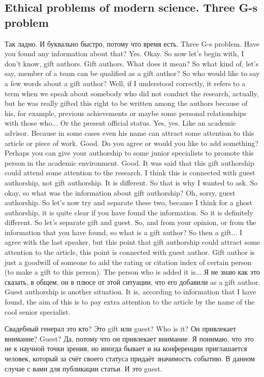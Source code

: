 \documentclass[main.tex]{subfiles}
\begin{document}
\subsection{Ethical problems of modern science. Three G-s problem}

Так ладно.
И буквально быстро, потому что время есть.
Three G-s problem.
Have you found any information about that?
Yes.
Okay.
So now let's begin with, I don't know, gift authors.
Gift authors.
What does it mean?
So what kind of, let's say, member of a team can be qualified as a gift author?
So who would like to say a few words about a gift author?
Well, if I understood correctly, it refers to a term when we speak about somebody who did not conduct the research, actually, but he was really gifted this right to be written among the authors because of his, for example, previous achievements or maybe some personal relationships with those who...
Or the present official status.
Yes, yes.
Like an academic advisor.
Because in some cases even his name can attract some attention to this article or piece of work.
Good.
Do you agree or would you like to add something?
Perhaps you can give your authorship to some junior specialists to promote this person in the academic environment.
Good.
It was said that this gift authorship could attend some attention to the research.
I think this is connected with guest authorship, not gift authorship.
It is different.
So that is why I wanted to ask.
So okay, so what was the information about gift authorship?
Oh, sorry, guest authorship.
So let's now try and separate these two, because I think for a ghost authorship, it is quite clear if you have found the information.
So it is definitely different.
So let's separate gift and guest.
So, and from your opinion, or from the information that you have found, so what is a gift author?
So then a gift...
I agree with the last speaker, but this point that gift authorship could attract some attention to the article, this point is connected with guest author.
Gift author is just a goodwill of someone to add the rating or citation index of certain person (to make a gift to this person).
The person who is added it is...
Я не знаю как это сказать, в общем, он в плюсе от этой ситуации, что его добавили as a gift author.
Guest authorship is another situation.
It is, according to information that I have found, the aim of this is to pay extra attention to the article by the name of the cool senior specialist.

Свадебный генерал это кто?
Это gift или guest?
Who is it?
Он привлекает внимание?
Guest?
Да, потому что он привлекает внимание.
Я понимаю, что это не к научной точки зрения, но иногда бывает и на конференции приглашается человек, который за счёт своего статуса придаёт значимость событию.
В данном случае с вами для публикации статьи.
И это guest.
\end{document}
